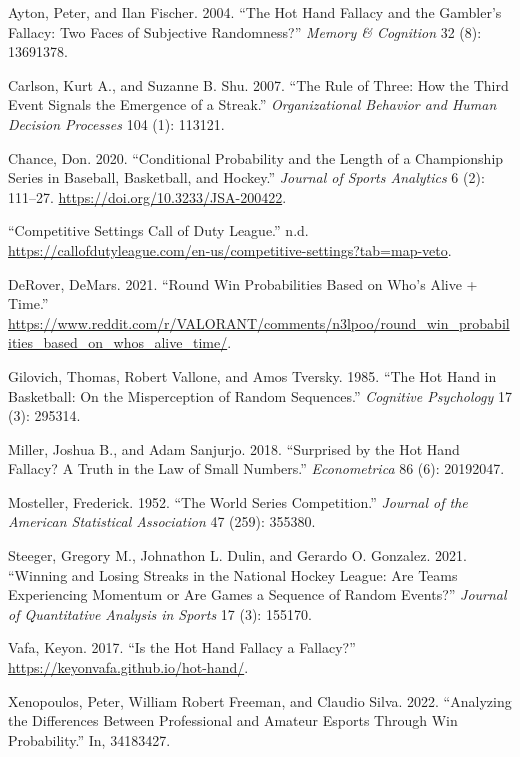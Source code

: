 \documentclass{article}
\newlength{\cslhangindent}
\newlength{\cslentryspacingunit} %
\newenvironment{CSLReferences}[2] %
 {%
  \setlength{\parindent}{0pt}
  \ifodd #1
  \let\oldpar\par
  \def\par{\hangindent=\cslhangindent\oldpar}
  \fi
  \setlength{\parskip}{#2\cslentryspacingunit}
 }%
 {}
\begin{document}
\hypertarget{refs}{}
\begin{CSLReferences}{1}{0}
\leavevmode{}%
Ayton, Peter, and Ilan Fischer. 2004. {``The Hot Hand Fallacy and the
Gambler{'}s Fallacy: Two Faces of Subjective Randomness?''} \emph{Memory
\& Cognition} 32 (8): 13691378.

\leavevmode{}%
Carlson, Kurt A., and Suzanne B. Shu. 2007. {``The Rule of Three: How
the Third Event Signals the Emergence of a Streak.''}
\emph{Organizational Behavior and Human Decision Processes} 104 (1):
113121.

\leavevmode{}%
Chance, Don. 2020. {``Conditional Probability and the Length of a
Championship Series in Baseball, Basketball, and Hockey.''}
\emph{Journal of Sports Analytics} 6 (2): 111--27.
\url{https://doi.org/10.3233/JSA-200422}.

\leavevmode{}%
{``Competitive Settings \textbar{} Call of Duty League.''} n.d.
\url{https://callofdutyleague.com/en-us/competitive-settings?tab=map-veto}.

\leavevmode{}%
DeRover, DeMars. 2021. {``Round Win Probabilities Based on Who's Alive +
Time.''}
\url{https://www.reddit.com/r/VALORANT/comments/n3lpoo/round_win_probabilities_based_on_whos_alive_time/}.

\leavevmode{}%
Gilovich, Thomas, Robert Vallone, and Amos Tversky. 1985. {``The Hot
Hand in Basketball: On the Misperception of Random Sequences.''}
\emph{Cognitive Psychology} 17 (3): 295314.

\leavevmode{}%
Miller, Joshua B., and Adam Sanjurjo. 2018. {``Surprised by the Hot Hand
Fallacy? A Truth in the Law of Small Numbers.''} \emph{Econometrica} 86
(6): 20192047.

\leavevmode{}%
Mosteller, Frederick. 1952. {``The World Series Competition.''}
\emph{Journal of the American Statistical Association} 47 (259): 355380.

\leavevmode{}%
Steeger, Gregory M., Johnathon L. Dulin, and Gerardo O. Gonzalez. 2021.
{``Winning and Losing Streaks in the National Hockey League: Are Teams
Experiencing Momentum or Are Games a Sequence of Random Events?''}
\emph{Journal of Quantitative Analysis in Sports} 17 (3): 155170.

\leavevmode{}%
Vafa, Keyon. 2017. {``Is the Hot Hand Fallacy a Fallacy?''}
\url{https://keyonvafa.github.io/hot-hand/}.

\leavevmode{}%
Xenopoulos, Peter, William Robert Freeman, and Claudio Silva. 2022.
{``Analyzing the Differences Between Professional and Amateur Esports
Through Win Probability.''} In, 34183427.

\end{CSLReferences}



\end{document}
